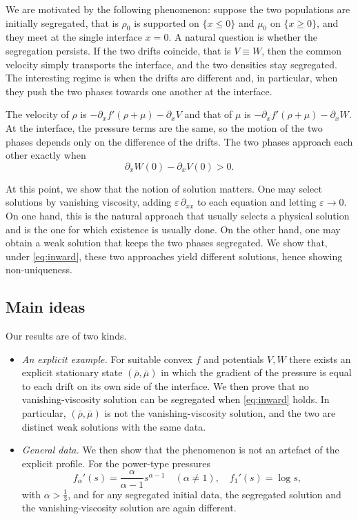 \documentclass[a4paper,twosided, 11pt]{article}
\newcommand{\eps}{\varepsilon}
\theoremstyle{plain}
\theoremstyle{remark}
\numberwithin{equation}{section}
\begin{document}
\medskip 

We are motivated by the following phenomenon: suppose the two populations are initially segregated, that is $\rho_0$ is supported
on $\{x\le 0\}$ and $\mu_0$ on $\{x\ge 0\}$, and they meet at the single interface $x=0$. A natural question is whether the segregation persists. If the two drifts coincide, that is $V\equiv W$, then the common velocity simply transports the interface, and the two densities stay segregated. The interesting regime is when the drifts are different and, in particular, when they push the two phases towards one another at the interface. 

\medskip 

The velocity of $\rho$ is $-\partial_x f'(\rho+\mu)-\partial_x V$ and that of $\mu$ is $-\partial_x f'(\rho+\mu)-\partial_x W$. 
At the interface, the pressure terms are the same, so the motion of the two phases depends only on the difference of the drifts. 
The two phases approach each other exactly when
\begin{equation}\label{eq:inward}
\partial_xW(0)-\partial_x V(0)>0 .
\end{equation}

At this point, we show that the notion of solution matters. One may select solutions by vanishing viscosity, adding $\eps\,\partial_{xx}$ to each equation and letting $\eps\to 0$. 
On one hand, this is the natural approach that usually selects a physical solution and is the one for which existence is usually done. On the other hand, one may obtain a weak solution that keeps the two phases segregated. We show that, under 
\eqref{eq:inward}, these two approaches yield different solutions, hence showing non-uniqueness.

\subsection{Main ideas}

Our results are of two kinds.
\begin{itemize}
    \item \textit{An explicit example.} For suitable convex $f$ and potentials $V,W$ there exists an explicit stationary state $(\bar\rho,\bar\mu)$ in which the gradient of the pressure is equal to each drift on its own side of the interface. We then prove that no vanishing-viscosity solution can be segregated when \eqref{eq:inward} holds. In particular, $(\bar\rho,\bar\mu)$ is not the vanishing-viscosity solution, and the two are distinct weak solutions with the same data.
    \item \textit{General data.} We then show that the phenomenon is not an artefact of the explicit profile. For the power-type pressures
    $$
    f_\alpha'(s)=\frac{\alpha}{\alpha-1}s^{\alpha-1}\quad(\alpha\neq1),
    \quad f_1'(s)=\log s,
    $$
with $\alpha>\frac13$, and for any segregated initial data, the segregated
solution and the vanishing-viscosity solution are again different.
\end{itemize}
\end{document}

